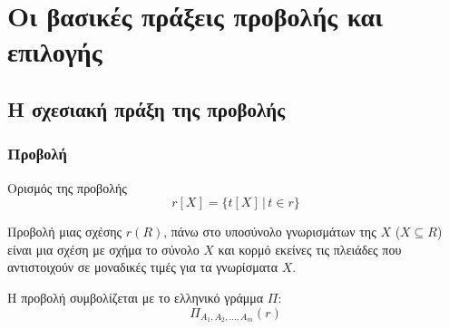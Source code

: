 
\section[{\en $\Pi, \sigma$}]{\textgreek{Οι βασικές πράξεις προβολής και επιλογής}}

\subsection[{\en Project}]{\textgreek{Η σχεσιακή πράξη της προβολής}}

\begin{frame}
\frametitle{Προβολή}
\begin{minipage}{\wE}
  \begin{block}{Ορισμός της προβολής}  \Large
    \[ r[X] = \{t[X] \,|\, t \in r \} \]
  \end{block}
  {\bb Προβολή} μιας σχέσης $r(R)$, πάνω στο υποσύνολο γνωρισμάτων της $X$
  ($X \subseteq R$)
  είναι μια σχέση με σχήμα το σύνολο $X$ και κορμό εκείνες τις πλειάδες που
  αντιστοιχούν σε μοναδικές τιμές για τα γνωρίσματα $X$.
  \par Η προβολή συμβολίζεται με το ελληνικό γράμμα $\Pi$:
  \[
    \Pi_{A_1, A_2, \ldots, A_m}(r)
  \]
\end{minipage}
\end{frame}


